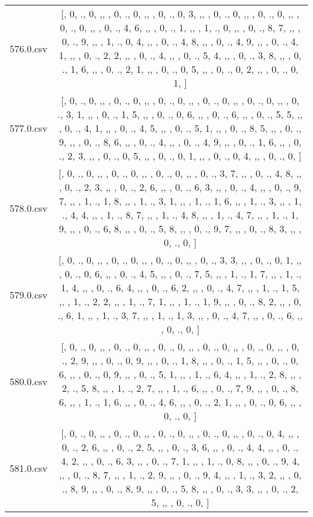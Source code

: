 \begin{table}[ht]
\begin{tabular}{@{}c c@{}}
	576.0.csv & [, 0, ., 0, ,,  , 0, ., 0, ,,  , 0, ., 0, 3, ,,  , 0, ., 0, ,,  , 0, ., 0, ,,  , 0, ., 0, ,,  , 0, ., 4, 6, ,,  , 0, ., 1, ,,  , 1, ., 0, ,,  , 0, ., 8, 7, ,,  , 0, ., 9, ,,  , 1, ., 0, 4, ,,  , 0, ., 4, 8, ,,  , 0, ., 4, 9, ,,  , 0, ., 4, 1, ,,  , 0, ., 2, 2, ,,  , 0, ., 4, ,,  , 0, ., 5, 4, ,,  , 0, ., 3, 8, ,,  , 0, ., 1, 6, ,,  , 0, ., 2, 1, ,,  , 0, ., 0, 5, ,,  , 0, ., 0, 2, ,,  , 0, ., 0, 1, ]\\ 
	577.0.csv & [, 0, ., 0, ,,  , 0, ., 0, ,,  , 0, ., 0, ,,  , 0, ., 0, ,,  , 0, ., 0, ,,  , 0, ., 3, 1, ,,  , 0, ., 1, 5, ,,  , 0, ., 0, 6, ,,  , 0, ., 6, ,,  , 0, ., 5, 5, ,,  , 0, ., 4, 1, ,,  , 0, ., 4, 5, ,,  , 0, ., 5, 1, ,,  , 0, ., 8, 5, ,,  , 0, ., 9, ,,  , 0, ., 8, 6, ,,  , 0, ., 4, ,,  , 0, ., 4, 9, ,,  , 0, ., 1, 6, ,,  , 0, ., 2, 3, ,,  , 0, ., 0, 5, ,,  , 0, ., 0, 1, ,,  , 0, ., 0, 4, ,,  , 0, ., 0, ]\\ 
	578.0.csv & [, 0, ., 0, ,,  , 0, ., 0, ,,  , 0, ., 0, ,,  , 0, ., 3, 7, ,,  , 0, ., 4, 8, ,,  , 0, ., 2, 3, ,,  , 0, ., 2, 6, ,,  , 0, ., 6, 3, ,,  , 0, ., 4, ,,  , 0, ., 9, 7, ,,  , 1, ., 1, 8, ,,  , 1, ., 3, 1, ,,  , 1, ., 1, 6, ,,  , 1, ., 3, ,,  , 1, ., 4, 4, ,,  , 1, ., 8, 7, ,,  , 1, ., 4, 8, ,,  , 1, ., 4, 7, ,,  , 1, ., 1, 9, ,,  , 0, ., 6, 8, ,,  , 0, ., 5, 8, ,,  , 0, ., 9, 7, ,,  , 0, ., 8, 3, ,,  , 0, ., 0, ]\\ 
	579.0.csv & [, 0, ., 0, ,,  , 0, ., 0, ,,  , 0, ., 0, ,,  , 0, ., 3, 3, ,,  , 0, ., 0, 1, ,,  , 0, ., 0, 6, ,,  , 0, ., 4, 5, ,,  , 0, ., 7, 5, ,,  , 1, ., 1, 7, ,,  , 1, ., 1, 4, ,,  , 0, ., 6, 4, ,,  , 0, ., 6, 2, ,,  , 0, ., 4, 7, ,,  , 1, ., 1, 5, ,,  , 1, ., 2, 2, ,,  , 1, ., 7, 1, ,,  , 1, ., 1, 9, ,,  , 0, ., 8, 2, ,,  , 0, ., 6, 1, ,,  , 1, ., 3, 7, ,,  , 1, ., 1, 3, ,,  , 0, ., 4, 7, ,,  , 0, ., 6, ,,  , 0, ., 0, ]\\ 
	580.0.csv & [, 0, ., 0, ,,  , 0, ., 0, ,,  , 0, ., 0, ,,  , 0, ., 0, ,,  , 0, ., 0, ,,  , 0, ., 2, 9, ,,  , 0, ., 0, 9, ,,  , 0, ., 1, 8, ,,  , 0, ., 1, 5, ,,  , 0, ., 0, 6, ,,  , 0, ., 0, 9, ,,  , 0, ., 5, 1, ,,  , 1, ., 6, 4, ,,  , 1, ., 2, 8, ,,  , 2, ., 5, 8, ,,  , 1, ., 2, 7, ,,  , 1, ., 6, ,,  , 0, ., 7, 9, ,,  , 0, ., 8, 6, ,,  , 1, ., 1, 6, ,,  , 0, ., 4, 6, ,,  , 0, ., 2, 1, ,,  , 0, ., 0, 6, ,,  , 0, ., 0, ]\\ 
	581.0.csv & [, 0, ., 0, ,,  , 0, ., 0, ,,  , 0, ., 0, ,,  , 0, ., 0, ,,  , 0, ., 0, 4, ,,  , 0, ., 2, 6, ,,  , 0, ., 2, 5, ,,  , 0, ., 3, 6, ,,  , 0, ., 4, 4, ,,  , 0, ., 4, 2, ,,  , 0, ., 6, 3, ,,  , 0, ., 7, 1, ,,  , 1, ., 0, 8, ,,  , 0, ., 9, 4, ,,  , 0, ., 8, 7, ,,  , 1, ., 2, 9, ,,  , 0, ., 9, 4, ,,  , 1, ., 3, 2, ,,  , 0, ., 8, 9, ,,  , 0, ., 8, 9, ,,  , 0, ., 5, 8, ,,  , 0, ., 3, 3, ,,  , 0, ., 2, 5, ,,  , 0, ., 0, ]\\ 

\end{tabular}
\end{table}
